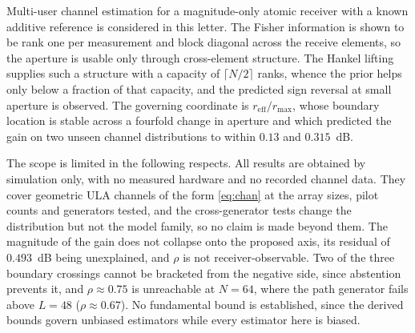 \documentclass[journal]{IEEEtran}
\newcommand{\reff}{r_{\mathrm{eff}}}
\newcommand{\rmax}{r_{\max}}
\begin{document}
Multi-user channel estimation for a magnitude-only atomic receiver with a known
additive reference is considered in this letter. The Fisher information is shown
to be rank one per measurement and block diagonal across the receive elements,
so the aperture is usable only through cross-element structure. The Hankel
lifting supplies such a structure with a capacity of $\lceil N/2\rceil$ ranks,
whence the prior helps only below a fraction of that capacity, and the predicted
sign reversal at small aperture is observed. The governing coordinate is
$\reff/\rmax$, whose boundary location is stable across a fourfold change in
aperture and which predicted the gain on two unseen channel distributions to
within $0.13$ and $0.315$~dB.

The scope is limited in the following respects. All results are obtained by
simulation only, with no measured hardware and no recorded channel data. They
cover geometric ULA channels of the form \eqref{eq:chan} at the array sizes,
pilot counts and generators tested, and the cross-generator tests change the
distribution but not the model family, so no claim is made beyond them. The
magnitude of the gain does not collapse onto the proposed axis, its residual of
$0.493$~dB being unexplained, and $\rho$ is not receiver-observable. Two of the
three boundary crossings cannot be bracketed from the negative side, since
abstention prevents it, and $\rho\approx0.75$ is unreachable at $N=64$, where the
path generator fails above $L=48$ ($\rho\approx0.67$). No fundamental bound is
established, since the derived bounds govern unbiased estimators while every
estimator here is biased.
\end{document}
